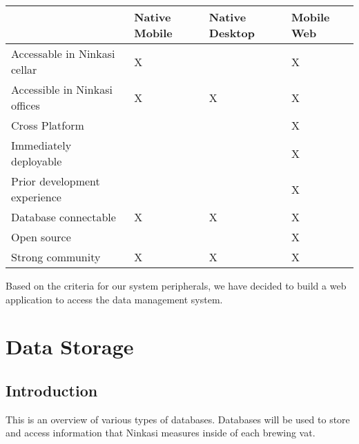 \documentclass[draftclsnofoot,onecolumn,letterpaper,10pt,compsoc]{IEEEtran}
\begin{document}
		        \begin{center}
		            \begin{tabular}{ |m{14em}|m{9em}|m{9em}|m{9em}|}
		                \hline
		                    & Native Mobile & Native Desktop & Mobile Web \\

		                \hline
		                    Accessable in Ninkasi cellar & X & & X \\

		                \hline
		                    Accessible in Ninkasi offices & X & X & X \\

		                \hline
		                    Cross Platform &  &  & X \\

		                \hline
		                    Immediately deployable &  &  & X \\

		                \hline
		                    Prior development experience &  &  & X \\

		                \hline
		                     Database connectable & X & X & X \\

		                \hline
		                    Open source & & & X \\

		                \hline
		                    Strong community & X & X & X \\

		                \hline

		            \end{tabular}
		        \end{center}

		    Based on the criteria for our system peripherals, we have decided to build a web application to access the data management system.

		\section{Data Storage}
		    \subsection{Introduction}
		    This is an overview of various types of databases. Databases will be used to store and access information that Ninkasi measures inside of each brewing vat.
\end{document}
